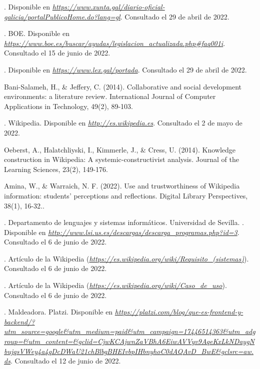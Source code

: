 

\begin{thebibliography}{99}

. Disponible en {\it \url{https://www.xunta.gal/diario-oficial-galicia/portalPublicoHome.do?lang=gl}}. Consultado el 29 de abril de 2022.

. BOE. Disponible en {\it \url{https://www.boe.es/buscar/ayudas/legislacion_actualizada.php#faq001i}}. Consultado el 15 de junio de 2022.

. Disponible en {\it \url{https://www.lex.gal/portada}}. Consultado el 29 de abril de 2022.

 Bani-Salameh, H., \& Jeffery, C. (2014). Collaborative and social development environments: a literature review. International Journal of Computer Applications in Technology, 49(2), 89-103.

. Wikipedia. Disponible en {\it \url{http://es.wikipedia.es}}. Consultado el 2 de mayo de 2022.

 Oeberst, A., Halatchliyski, I., Kimmerle, J., \& Cress, U. (2014). Knowledge construction in Wikipedia: A systemic-constructivist analysis. Journal of the Learning Sciences, 23(2), 149-176.

 Amina, W., \& Warraich, N. F. (2022). Use and trustworthiness of Wikipedia information: students’ perceptions and reflections. Digital Library Perspectives, 38(1), 16-32..

. Departamento de lenguajes y sistemas informáticos. Universidad de Sevilla. . Disponible en {\it \url{http://www.lsi.us.es/descargas/descarga_programas.php?id=3}}. Consultado el 6 de junio de 2022.

. Artículo de la Wikipedia ({\it \url{https://es.wikipedia.org/wiki/Requisito_(sistemas)}}). Consultado el 6 de junio de 2022.

. Artículo de la Wikipedia ({\it \url{https://es.wikipedia.org/wiki/Caso_de_uso}}). Consultado el 6 de junio de 2022.

. Maldeadora. Platzi. Disponible en {\it \url{https://platzi.com/blog/que-es-frontend-y-backend/?utm_source=google&utm_medium=paid&utm_campaign=17446514363&utm_adgroup=&utm_content=&gclid=CjwKCAjwnZaVBhA6EiwAVVyv9AqeKxLkNDaygNbujqsVWey4a4qDcDWaU21chBlbgBHEIvbpIHbnyhoC0dAQAvD_BwE&gclsrc=aw.ds}}. Consultado el 12 de junio de 2022.


\end{thebibliography}
